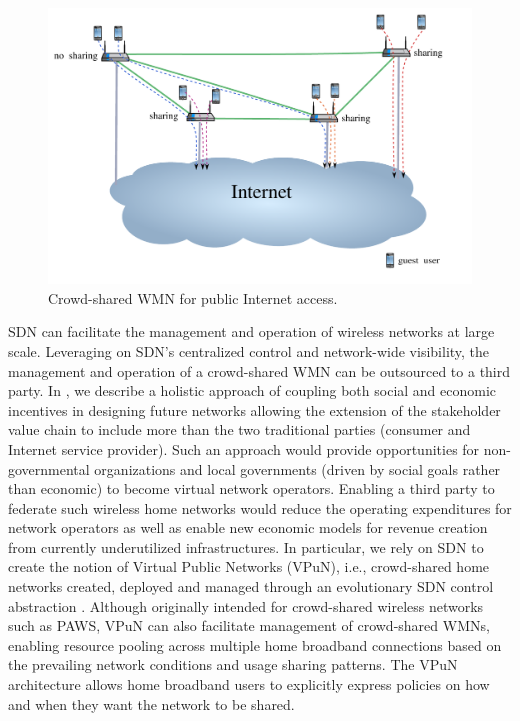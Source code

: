 \begin{figure}[t]
\begin{center}
\includegraphics[width=1\linewidth]{flow_redirection.pdf}  
\caption{Crowd-shared WMN for public Internet access.}
\label{fig:wmn}
\end{center}
\end{figure}

SDN can facilitate the management and operation of wireless networks at large scale. Leveraging on SDN's centralized control and network-wide visibility, the management and operation of a crowd-shared WMN can be outsourced to a third party. In \cite{EWSDN}, we describe a holistic approach of coupling both social and economic incentives in designing future networks allowing the extension of the stakeholder value chain to include more than the two traditional parties (consumer and Internet service provider). Such an approach would provide opportunities for non-governmental organizations and local governments (driven by social goals rather than economic) to become virtual network operators. Enabling a third party to federate such wireless home networks would reduce the operating expenditures for network operators as well as enable new economic models for revenue creation from currently underutilized infrastructures. In particular, we rely on SDN to create the notion of Virtual Public Networks (VPuN), i.e., crowd-shared home networks created, deployed and managed through an evolutionary SDN control abstraction \cite{EWSDN}. Although originally intended for crowd-shared wireless networks such as PAWS, VPuN can also facilitate management of crowd-shared WMNs, enabling resource pooling across multiple home broadband connections based on the prevailing network conditions and usage sharing patterns. The VPuN architecture allows home broadband users to explicitly express policies on how and when they want the network to be shared.

